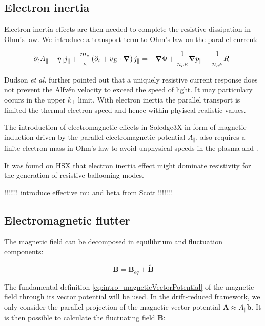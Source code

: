 \subsection{Electron inertia}

Electron inertia effects are then needed to complete the resistive dissipation in Ohm's law. We introduce a transport term to Ohm's law on the parallel current: 

\begin{equation}
	\label{eq:electromagneticElectronInertiaOhmsLaw}
	\partial_t A_\parallel + \eta_\parallel j_\parallel + \frac{m_e}{e}\left(\partial_t + v_E\cdot\grad\right)j_\parallel = -\grad\Phi + \frac{1}{n_ee}\grad p_\parallel + \frac{1}{n_ee}R_\parallel
\end{equation}

Dudson \emph{et al.}\cite{Dudson2021} further pointed out that a uniquely resistive current response does not prevent the Alfvén velocity to exceed the speed of light. It may particulary occurs in the upper $k_\perp$ limit. With electron inertia the parallel transport is limited the thermal electron speed and hence within phyiscal realistic values.

The introduction of electromagnetic effects in Soledge3X in form of magnetic induction driven by the parallel electromagnetic potential $A_\parallel$, also requires a finite electron mass in Ohm's law to avoid unphysical speeds in the plasma and .


It was found on HSX that electron inertia effect might dominate resistivity for the generation of resistive ballooning modes\cite{rafiq2009unified}.

!!!!!!!
introduce effective mu and beta from Scott
!!!!!!!


\subsection{Electromagnetic flutter}

The magnetic field can be decomposed in equilibrium and fluctuation components:

\begin{equation}
	\mathbf{B} = \mathbf{B}_{eq} + \mathbf{\tilde{B}}
\end{equation}

The fundamental definition \ref{eq:intro_magneticVectorPotential} of the magnetic field through its vector potential will be used. In the drift-reduced framework, we only consider the parallel projection of the magnetic vector potential $\mathbf{A} \approx A_\parallel\mathbf{b}$. It is then possible to calculate the fluctuating field $\mathbf{\tilde{B}}$:

